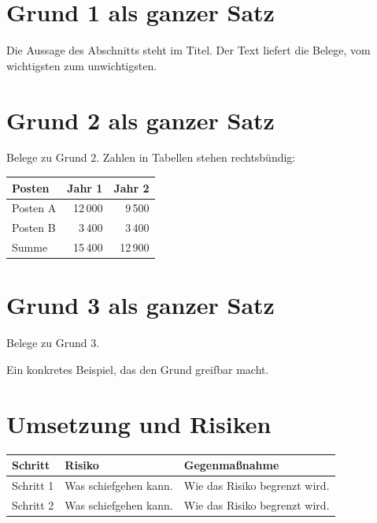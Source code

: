 \documentclass[11pt,a4paper]{scrartcl}
\begin{document}
\section{Grund 1 als ganzer Satz}\label{sec:grund1}

Die Aussage des Abschnitts steht im Titel. Der Text liefert die Belege,
vom wichtigsten zum unwichtigsten.

\section{Grund 2 als ganzer Satz}\label{sec:grund2}

Belege zu Grund 2. Zahlen in Tabellen stehen rechtsbündig:

\begin{tabularx}{\textwidth}{@{}Lrr@{}}
\toprule
\textbf{Posten} & \textbf{Jahr 1} & \textbf{Jahr 2} \\
\midrule
Posten A & 12\,000 & 9\,500 \\
Posten B & 3\,400 & 3\,400 \\
\midrule
Summe & 15\,400 & 12\,900 \\
\bottomrule
\end{tabularx}

\section{Grund 3 als ganzer Satz}\label{sec:grund3}

Belege zu Grund 3.

\begin{beispiel}
Ein konkretes Beispiel, das den Grund greifbar macht.
\end{beispiel}

\section{Umsetzung und Risiken}\label{sec:umsetzung}

{\small
\begin{longtable}{@{}>{\raggedright}p{3.4cm}>{\raggedright}p{5.4cm}>{\raggedright\arraybackslash}p{6.2cm}@{}}
\toprule
\textbf{Schritt} & \textbf{Risiko} & \textbf{Gegenmaßnahme} \\
\midrule
\endhead
\bottomrule
\endlastfoot
Schritt 1 & Was schiefgehen kann. & Wie das Risiko begrenzt wird. \\
Schritt 2 & Was schiefgehen kann. & Wie das Risiko begrenzt wird. \\
\end{longtable}
}
\end{document}
